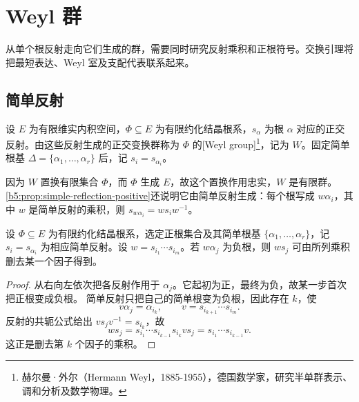 
\section{Weyl 群}
\label{b5:sec:1701}

从单个根反射走向它们生成的群，需要同时研究反射乘积和正根符号。交换引理将把最短表达、Weyl 室及支配代表联系起来。


%
%

\subsection{简单反射}
\label{b5:subsec:1701:01}

\begin{definition}\label{b5:def:weyl-group}
	设 \(E\) 为有限维实内积空间，\(\Phi\subseteq E\) 为有限约化结晶根系，\(s_\alpha\) 为根 \(\alpha\) 对应的正交反射。由这些反射生成的正交变换群称为 \(\Phi\) 的[Weyl group]\footnote{赫尔曼·外尔（Hermann Weyl，1885-1955），德国数学家，研究半单群表示、调和分析及数学物理。}，记为 \(W\)。固定简单根基 \(\Delta=\{\alpha_1,\ldots,\alpha_r\}\) 后，记 \(s_i=s_{\alpha_i}\)。
\end{definition}

因为 \(W\) 置换有限集合 \(\Phi\)，而 \(\Phi\) 生成 \(E\)，故这个置换作用忠实，\(W\) 是有限群。\cref{b5:prop:simple-reflection-positive}还说明它由简单反射生成：每个根写成 \(w\alpha_i\)，其中 \(w\) 是简单反射的乘积，则 \(s_{w\alpha_i}=ws_iw^{-1}\)。

\begin{lemma}[删去一个反射]\label{b5:lem:weyl-exchange}
	设 \(\Phi\subseteq E\) 为有限约化结晶根系，选定正根集合及其简单根基 \(\{\alpha_1,\ldots,\alpha_r\}\)，记 \(s_i=s_{\alpha_i}\) 为相应简单反射。设 \(w=s_{i_1}\cdots s_{i_m}\)。若 \(w\alpha_j\) 为负根，则 \(ws_j\) 可由所列乘积删去某一个因子得到。
\end{lemma}
\begin{proof}
	从右向左依次把各反射作用于 \(\alpha_j\)。它起初为正，最终为负，故某一步首次把正根变成负根。 简单反射只把自己的简单根变为负根，因此存在 \(k\)，使
	\[
		v\alpha_j=\alpha_{i_k},\qquad v=s_{i_{k+1}}\cdots s_{i_m}.
	\]
	反射的共轭公式给出 \(vs_jv^{-1}=s_{i_k}\)，故
	\[
		ws_j =s_{i_1}\cdots s_{i_{k-1}}s_{i_k}vs_j =s_{i_1}\cdots s_{i_{k-1}}v.
	\]
	这正是删去第 \(k\) 个因子的乘积。
\end{proof}

